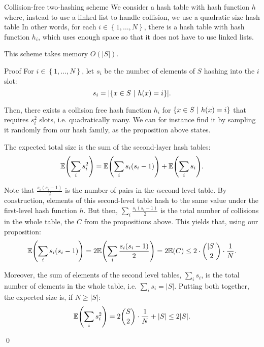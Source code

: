 \documentclass[a4paper]{article}
\begin{document}
\begin{parag}{Collision-free two-hashing scheme}
    We consider a hash table with hash function $h$ where, instead to use a linked list to handle collision, we use a quadratic size hash table In other words, for each $i \in \left\{1, \ldots, N\right\}$, there is a hash table with hash function $h_i$, which uses enough space so that it does not have to use linked lists.

    This scheme takes memory $O\left(\left|S\right|\right)$.

    \begin{subparag}{Proof}
        For $i \in \left\{1, \ldots, N\right\}$, let $s_i$ be the number of elements of $S$ hashing into the $i$\Th slot: 
        \[s_i = \left|\left\{x \in S \suchthat h\left(x\right) = i\right\}\right|.\]

        Then, there exists a collision free hash function $h_i$ for $\left\{x \in S \suchthat h\left(x\right) = i\right\}$ that requires $s_i^2$ slots, i.e. quadratically many. We can for instance find it by sampling it randomly from our hash family, as the proposition above states.

        The expected total size is the sum of the second-layer hash tables:
        \[\exval\left(\sum_{i} s_i^2\right) = \exval\left(\sum_{i} s_i\left(s_i - 1\right)\right) + \exval\left(\sum_{i} s_i\right).\]

        Note that $\frac{s_i\left(s_i - 1\right)}{2}$ is the number of pairs in the $i$\Th second-level table. By construction, elements of this second-level table hash to the same value under the first-level hash function $h$. But then, $\sum_{i} \frac{s_i \left(s_i - 1\right)}{2}$ is the total number of collisions in the whole table, the $C$ from the propositions above. This yields that, using our proposition: 
        \[\exval\left(\sum_{i} s_i\left(s_i - 1\right)\right) = 2 \exval\left(\sum_{i} \frac{s_i\left(s_i - 1\right)}{2}\right) = 2 \exval\left(C\right) \leq 2\cdot \binom{\left|S\right|}{2} \cdot \frac{1}{N}.\]

        Moreover, the sum of elements of the second level tables, $\sum_{i} s_i$, is the total number of elements in the whole table, i.e. $\sum_{i} s_i = \left|S\right|$. Putting both together, the expected size is, if $N \geq \left|S\right|$: 
        \[\exval\left(\sum_{i} s_i^2\right) = 2 \binom{S}{2}\cdot \frac{1}{N} + \left|S\right| \leq 2\left|S\right|.\]

        \qed
    \end{subparag}
\end{parag}
\end{document}
